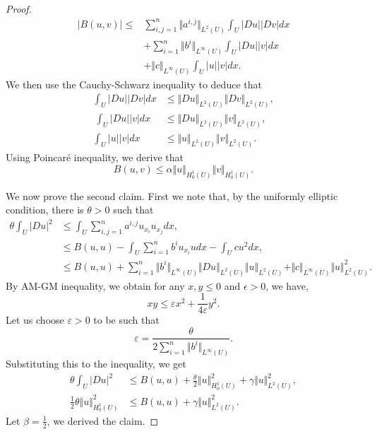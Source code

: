 \documentclass{article}
\numberwithin{equation}{section}
\begin{document}
\begin{proof}
\begin{align*}
\vert B(u,v)\vert \leq & \sum_{i,j=1}^n \Vert a^{i,j}\Vert_{L^2(U)}\int_U \vert Du\vert\vert Dv\vert dx\\
& +\sum_{i=1}^n\Vert b^i\Vert_{L^\infty(U)}\int_U\vert Du\vert\vert v\vert dx\\
& + \Vert c\Vert_{L^\infty(U)}\int_U\vert u\vert\vert v\vert dx.
\end{align*}
We then use the Cauchy-Schwarz inequality to deduce that
\begin{align*}
\int_U \vert Du\vert\vert Dv\vert dx&\leq \Vert Du\Vert_{L^2(U)}\Vert Dv\Vert_{L^2(U)},\\\
\int_U\vert Du\vert\vert v\vert dx &\leq \Vert Du\Vert_{L^2(U)}\Vert v\Vert_{L^2(U)},\\
\int_U\vert u\vert\vert v\vert dx & \leq \Vert u\Vert_{L^2(U)}\Vert v\Vert_{L^2(U)}.
\end{align*}
Using Poincaré inequality, we derive that
\begin{equation*}
B(u,v)\leq \alpha \Vert u\Vert_{H_0^1(U)}\Vert v\Vert_{H_0^1(U)}.
\end{equation*}
\par We now prove the second claim. First we note that, by the uniformly elliptic condition, there is $\theta>0$ such that 
\begin{align*}
\theta\int_U\vert Du\vert^2&\leq\int_U\sum_{i,j=1}^n a^{i,j}u_{x_i}u_{x_j}dx,\\
&\leq B(u,u)-\int_U\sum_{i=1}^nb^iu_{x_i}udx-\int_Ucu^2dx,\\
& \leq B(u,u)+\sum_{i=1}^n\Vert b^i\Vert_{L^\infty(U)}\Vert Du\Vert_{L^2(U)}\Vert u\Vert_{L^2(U)}+\Vert c\Vert_{L^\infty(U)}\Vert u\Vert_{L^2(U)}^2.
\end{align*}
By AM-GM inequality, we obtain for any $x,y\leq 0$ and $\epsilon>0$, we have,
\begin{equation*}
xy\leq \varepsilon x^2+{\frac 1 {4\varepsilon}}y^2.
\end{equation*}
Let us choose $\varepsilon>0$ to be such that
\begin{equation*}
\varepsilon = {\frac \theta {2\sum_{i=1}^n\Vert b^i\Vert_{L^\infty(U)}}}.
\end{equation*}
Substituting this to the inequality, we get
\begin{align*}
\theta\int_U\vert Du\vert^2&\leq B(u,u)+{\frac \theta 2}\Vert u\Vert^2_{H^1_0(U)}+\gamma\Vert u\Vert_{L^2(U)}^2,\\
{\frac 1 2}\theta\Vert u\Vert_{H^1_0(U)}^2 &\leq B(u,u)+\gamma\Vert u\Vert^2_{L^2(U)}.
\end{align*}
Let $\beta={\frac 1 2}$, we derived the claim.
\end{proof}
\end{document}

